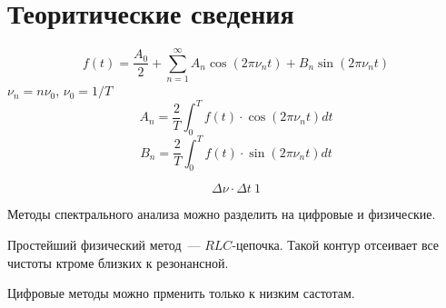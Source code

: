 \section{Теоритические сведения}
\[
    f(t) = \frac{A_{0}}{2} + \sum_{n=1}^{\infty} A_{n}\cos(2\pi\nu_{n}t)+B_{n}\sin(2\pi\nu_{n}t)
\]
$\nu_{n} = n\nu_{0}$, $\nu_{0} = 1/T$
\[
    A_{n} = \frac{2}{T}\int_{0}^{T}f(t)\cdot \cos(2\pi\nu_{n}t)dt
\]
\[
    B_{n} = \frac{2}{T}\int_{0}^{T}f(t) \cdot \sin(2\pi\nu_{n}t)dt
\]

\[
    \Delta \nu \cdot \Delta t ~ 1
\]

Методы спектрального анализа можно разделить на цифровые и физические.

Простейший физический метод~--- $RLC$-цепочка. Такой контур отсеивает все чистоты ктроме
близких к резонансной. 

Цифровые методы можно прменить только к низким састотам. 

